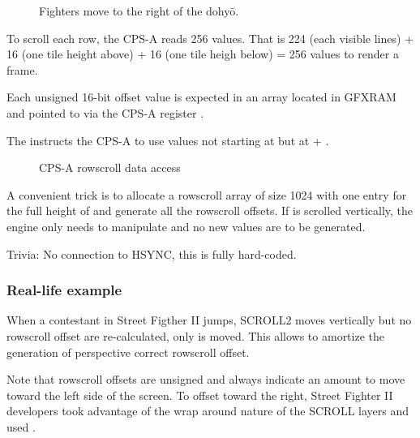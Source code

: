 \begin{figure}[H]
\caption*{Fighters move to the right of the dohyō.}
 \end{figure}%

To scroll each row, the CPS-A reads 256 values. That is 224 (each visible lines) + 16 (one tile height above) + 16 (one tile heigh below) = 256 values to render a frame.

Each unsigned 16-bit offset value is expected in an array located in GFXRAM and pointed to via the CPS-A register .

The  instructs the CPS-A to use values not starting at  but at  + . 

\begin{figure}[H]
 \caption*{CPS-A rowscroll data access}%
 \end{figure}%

A convenient trick is to allocate a rowscroll array of size 1024 with one entry for the full height of  and generate all the rowscroll offsets. If  is scrolled vertically, the engine only needs to manipulate  and no new values are to be generated.

 

Trivia: No connection to HSYNC, this is fully hard-coded.

\subsubsection{Real-life example}

When a contestant in Street Figther II jumps, SCROLL2 moves vertically but no rowscroll offset are re-calculated, only   is moved. This allows to amortize the generation of perspective correct rowscroll offset.

Note that rowscroll offsets are unsigned and always indicate an amount to move toward the left side of the screen. To offset toward the right, Street Fighter II developers took advantage of the wrap around nature of the SCROLL layers and used .

